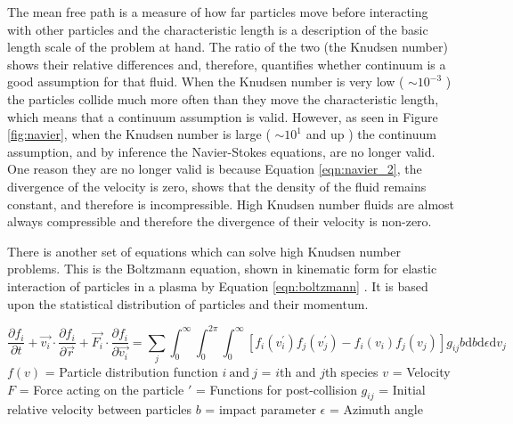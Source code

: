 \indent The mean free path is a measure of how far particles move before interacting with other particles and the characteristic length is a description of the basic length scale of the problem at hand. The ratio of the two (the Knudsen number) shows their relative differences and, therefore, quantifies whether continuum is a good assumption for that fluid. When the Knudsen number is very low ( \(\sim10^{-3}\) ) the particles collide much more often than they move the characteristic length, which means that a continuum assumption is valid. However, as seen in Figure \ref{fig:navier}, when the Knudsen number is large ( \(\sim10^{1}\) and up ) the continuum assumption, and by inference the Navier-Stokes equations, are no longer valid. One reason they are no longer valid is because Equation \ref{eqn:navier_2}, the divergence of the velocity is zero, shows that the density of the fluid remains constant, and therefore is incompressible. High Knudsen number fluids are almost always compressible and therefore the divergence of their velocity is non-zero. \par


\indent There is another set of equations which can solve high Knudsen number problems. This is the Boltzmann equation, shown in kinematic form for elastic interaction of particles in a plasma by Equation \ref{eqn:boltzmann} \cite{boltzmann}. It is based upon the statistical distribution of particles and their momentum. \par


\begin{equation}
    \label{eqn:boltzmann}
    \frac{\partial f_i}{\partial t} + \vec{v_i} \cdot \frac{\partial f_i}{\partial \vec{r}} + \vec{F_i} \cdot \frac{\partial f_i}{\partial \vec{v_i}} = \sum_j \int_0^\infty \int_0^{2\pi} \int_0^\infty  [ f_i(v_i^\prime) f_j (v_j^\prime) - f_i (v_i) f_j (v_j) ] g_{ij} b \text{d} b \text{d} \epsilon \text{d} v_j
\end{equation}
\(f(v)\) = Particle distribution function \newline
\(i \: \text{and} \: j\) =  \(i\)th and \(j\)th species \newline
\(v\) = Velocity  \newline
\(F\) = Force acting on the particle \newline
\(\prime\) = Functions for post-collision \newline
\(g_{ij}\) = Initial relative velocity between particles \newline
\(b\) = impact parameter \newline
\(\epsilon\) = Azimuth angle \par

